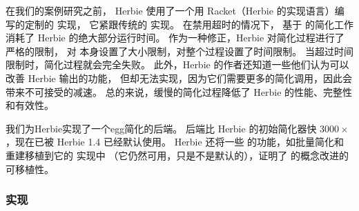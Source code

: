 在我们的案例研究之前，
  Herbie 使用了一个用 Racket（Herbie 的实现语言）编写的定制的 \egraph 实现，
  它紧跟传统的 \egraph 实现。
在禁用超时的情况下，
  基于 \egraph 的简化工作消耗了 Herbie 的绝大部分运行时间。
作为一种修正，Herbie 对简化过程进行了严格的限制，
  对 \egraph 本身设置了大小限制，对整个过程设置了时间限制。
当超过时间限制时，简化过程就会完全失败。
此外，Herbie 的作者还知道一些他们认为可以改善 Herbie 输出的功能，
  但却无法实现，因为它们需要更多的简化调用，因此会带来不可接受的减速。
总的来说，缓慢的简化过程降低了 Herbie 的性能、完整性和有效性。


我们为Herbie实现了一个egg简化的后端。
\egg 后端比 Herbie 的初始简化器快 $3000\times$，现在已被 Herbie 1.4 已经默认使用。
Herbie 还将一些 \egg 的功能，如批量简化和重建移植到它的 \egraph 实现中
  （它仍然可用，只是不是默认的），证明了 \egg 的概念改进的可移植性。


\subsubsection{实现}

